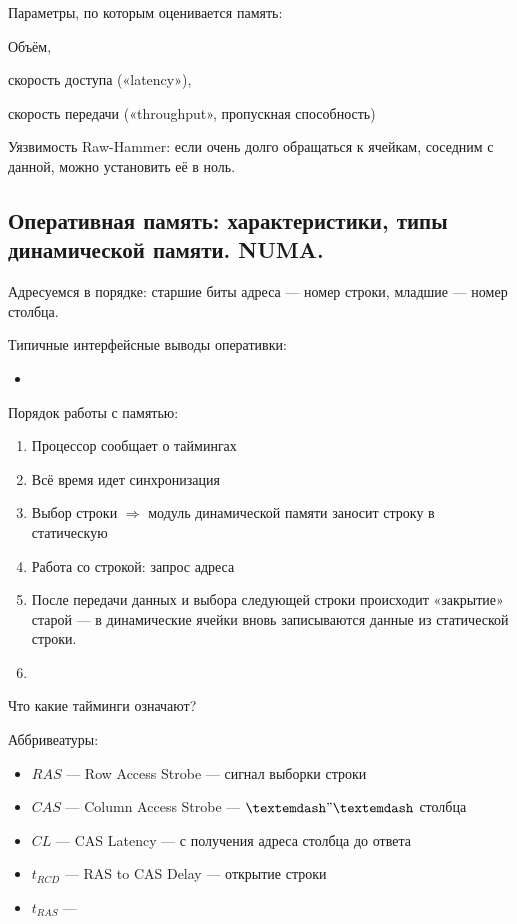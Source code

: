 \documentclass[12pt, a4paper]{article}
\begin{document}
Параметры, по которым оценивается память:
\begin{center}
    Объём, 
    
    скорость доступа («latency»), 
    
    скорость передачи («throughput», пропускная способность)
\end{center}

Уязвимость Raw-Hammer: если очень долго обращаться к ячейкам, соседним с данной, можно установить её в ноль.




\subsection{Оперативная память: характеристики, типы динамической памяти. NUMA.}

Адресуемся в порядке: старшие биты адреса — номер строки, младшие — номер столбца.

Типичные интерфейсные выводы оперативки:

\begin{itemize}
    \item 
\end{itemize}

Порядок работы с памятью: 
\begin{enumerate}
    \item Процессор сообщает о таймингах
    \item Всё время идет синхронизация 
    \item Выбор строки $\Rightarrow$ модуль динамической памяти заносит строку в статическую
    \item Работа со строкой: запрос адреса
    \item После передачи данных и выбора следующей строки происходит «закрытие» старой 
    — в динамические ячейки вновь записываются данные из статической строки.
    \item 
\end{enumerate}

Что какие тайминги означают?

Аббривеатуры: 
\begin{itemize}
    \item $RAS$ — Row Access Strobe — сигнал выборки строки
    \item $CAS$ — Column Access Strobe — $—"—$ столбца
\end{itemize}

\begin{itemize}
    \item $CL$ — CAS Latency — с получения адреса столбца до ответа
    \item $t_{RCD}$ — RAS to CAS Delay — открытие строки
    \item $t_{RAS}$ — 
\end{itemize}
\end{document}
